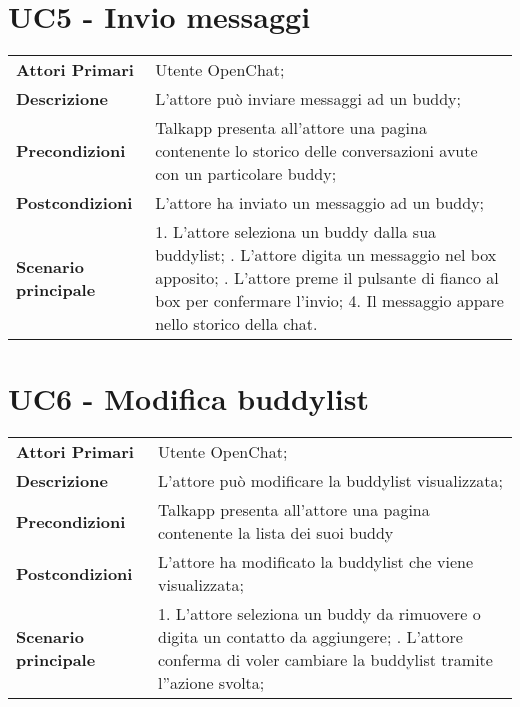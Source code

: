 
\section{UC5 - Invio messaggi}
\begin{center}
	\bgroup
	\def\arraystretch{1.8}     
	\begin{longtable}{  p{4cm} | p{9.5cm} } 
		\textbf{Attori Primari} & Utente OpenChat; \\ 
		\textbf{Descrizione} &  L'attore può inviare messaggi ad un buddy; \\ 
		\textbf{Precondizioni}  & Talkapp presenta all'attore una pagina contenente lo storico delle conversazioni avute con un particolare buddy; \\
		\textbf{Postcondizioni} & L'attore ha inviato un messaggio ad un buddy; \\ 
		\textbf{Scenario principale} & 
		1. L'attore seleziona un buddy dalla sua buddylist; \newline
		2. L'attore digita un messaggio nel box apposito; \newline
		3. L'attore preme il pulsante di fianco al box per confermare l'invio;
		4. Il messaggio appare nello storico della chat.
	\end{longtable}
	\egroup
\end{center}

\section{UC6 - Modifica buddylist}
\begin{center}
	\bgroup
	\def\arraystretch{1.8}     
	\begin{longtable}{  p{4cm} | p{9.5cm} } 
		\textbf{Attori Primari} & Utente OpenChat; \\ 
		\textbf{Descrizione} &  L'attore può modificare la buddylist visualizzata; \\ 
		\textbf{Precondizioni}  & Talkapp presenta all'attore una pagina contenente la lista dei suoi buddy \\
		\textbf{Postcondizioni} & L'attore ha modificato la buddylist che viene visualizzata; \\ 
		\textbf{Scenario principale} & 
		1. L'attore seleziona un buddy da rimuovere o digita un contatto da aggiungere; \newline
		2. L'attore conferma di voler cambiare la buddylist tramite l''azione svolta;
	\end{longtable}
	\egroup
\end{center}

